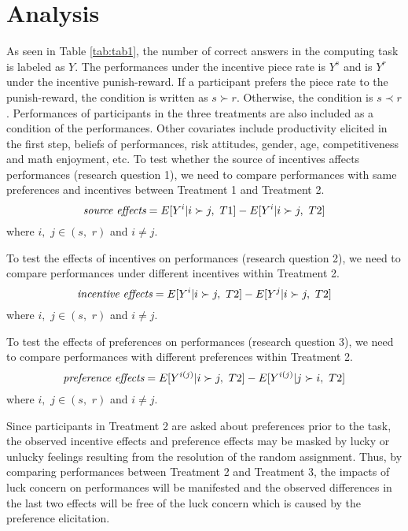 \documentclass[12pt]{article}
\begin{document}
\section{Analysis}

As seen in Table \ref{tab:tab1}, the number of correct answers in the computing task is labeled as $Y$. The performances under the incentive piece rate is $Y^{s}$ and is $Y^{r}$ under the incentive punish-reward. If a participant prefers the piece rate to the punish-reward, the condition is written as $s\succ r$. Otherwise, the condition is $s\prec r$. Performances of participants in the three treatments are also included as a condition of the performances. Other covariates include productivity elicited in the first step, beliefs of performances, risk attitudes, gender, age, competitiveness and math enjoyment, etc. To test whether the source of incentives affects performances (research question 1), we need to compare performances with same preferences and incentives between Treatment 1 and Treatment 2.
\begin{equation*}\textit{source\,\,effects}=E[Y^{i}|i\succ j,\,\, T1]-E[Y^{i}|i\succ j,\,\, T2]\end{equation*}
where $i,\,\,j \in (s,\,\,r)$ and $i\neq j$.

To test the effects of incentives on performances (research question 2), we need to compare performances under different incentives within Treatment 2.
\begin{equation*}\textit{incentive\,\,effects}=E[Y^{i}|i\succ j,\,\,T2]-E[Y^{j}|i\succ j,\,\, T2]\end{equation*}
where $i,\,\,j \in (s,\,\,r)$ and $i\neq j$.

To test the effects of preferences on performances (research question 3), we need to compare performances with different preferences within Treatment 2.
\begin{equation*}\textit{preference\,\,effects}=E[Y^{i(j)}|i\succ j,\,\,T2]-E[Y^{i(j)}|j\succ i,\,\, T2]\end{equation*}
where $i,\,\,j \in (s,\,\,r)$ and $i\neq j$.

Since participants in Treatment 2 are asked about preferences prior to the task, the observed incentive effects and preference effects may be masked by lucky or unlucky feelings resulting from the resolution of the random assignment. Thus, by comparing performances between Treatment 2 and Treatment 3, the impacts of luck concern on performances will be manifested and the observed differences in the last two effects will be free of the luck concern which is caused by the preference elicitation. 
\end{document}
